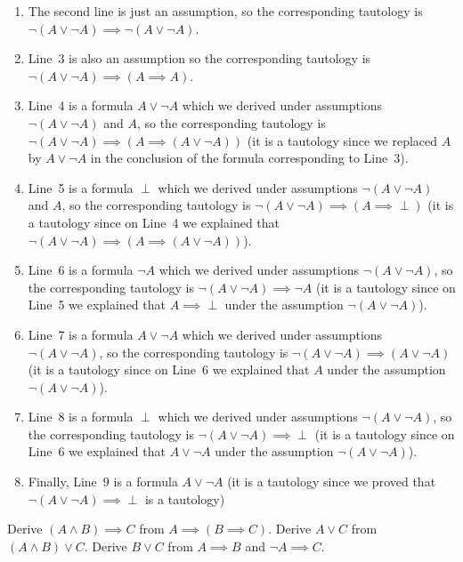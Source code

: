 \begin{enumerate}
  \item The second line is just an assumption, so the corresponding tautology is
    $\lnot (A \lor \lnot A) \implies \lnot (A \lor \lnot A)$.
  \item Line~3 is also an assumption so the corresponding tautology is
    $\lnot (A \lor \lnot A) \implies (A \implies A)$.
  \item Line~4 is a formula $A \lor \lnot A$ which we derived under assumptions
    $\lnot (A \lor \lnot A)$ and $A$, so the corresponding tautology is
    $\lnot (A \lor \lnot A) \implies (A \implies (A \lor \lnot A))$ (it is a
    tautology since we replaced $A$ by $A \lor \lnot A$ in the conclusion of
    the formula corresponding to Line~3).
  \item Line~5 is a formula $\perp$ which we derived under assumptions
    $\lnot (A \lor \lnot A)$ and $A$, so the corresponding tautology is
    $\lnot (A \lor \lnot A) \implies (A \implies \perp)$ (it is a
    tautology since on Line~4 we explained that $\lnot (A \lor \lnot A)
    \implies (A \implies (A \lor \lnot A))$).
  \item Line~6 is a formula $\lnot A$ which we derived under assumptions
    $\lnot (A \lor \lnot A)$, so the corresponding tautology is
    $\lnot (A \lor \lnot A) \implies \lnot A$ (it is a
    tautology since on Line~5 we explained that $A \implies \perp$ under the
    assumption $\lnot (A \lor \lnot A)$).
  \item Line~7 is a formula $A \lor \lnot A$ which we derived under assumptions
    $\lnot (A \lor \lnot A)$, so the corresponding tautology is
    $\lnot (A \lor \lnot A) \implies (A \lor \lnot A)$ (it is a
    tautology since on Line~6 we explained that $A$ under the
    assumption $\lnot (A \lor \lnot A)$).
  \item Line~8 is a formula $\perp$ which we derived under assumptions
    $\lnot (A \lor \lnot A)$, so the corresponding tautology is
    $\lnot (A \lor \lnot A) \implies \perp$ (it is a
    tautology since on Line~6 we explained that $A \lor \lnot A$ under the
    assumption $\lnot (A \lor \lnot A)$).
  \item Finally, Line~9 is a formula $A \lor \lnot A$ (it is a tautology since
    we proved that $\lnot (A \lor \lnot A) \implies \perp$ is a tautology)
\end{enumerate}



\begin{chapterendexercises}
  \exercise Derive $(A \land B) \implies C$ from
    $A \implies (B \implies C)$.
  \exercise Derive $A \lor C$ from
    $(A \land B) \lor C$.
  \exercise Derive $B \lor C$ from
    $A \implies B$ and $\lnot A \implies C$.
\end{chapterendexercises}
